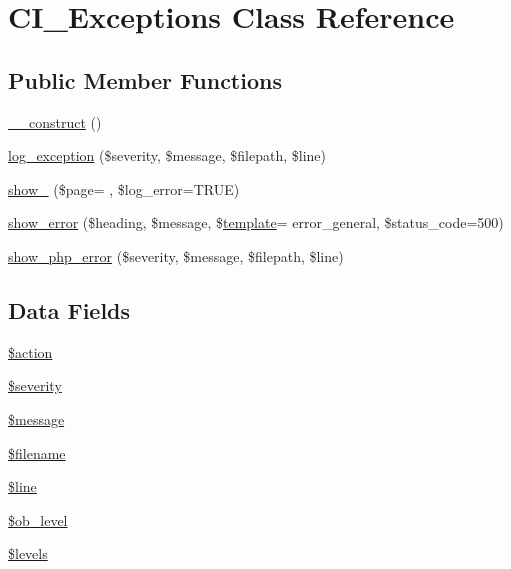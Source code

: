 \hypertarget{class_c_i___exceptions}{}\section{C\+I\+\_\+\+Exceptions Class Reference}
\label{class_c_i___exceptions}
\subsection*{Public Member Functions}
\begin{DoxyCompactItemize}
\item 
\hyperlink{class_c_i___exceptions_a095c5d389db211932136b53f25f39685}{\+\_\+\+\_\+construct} ()
\item 
\hyperlink{class_c_i___exceptions_a477bd3360509887aeb6e0a56bcdcad2a}{log\+\_\+exception} (\$severity, \$message, \$filepath, \$line)
\item 
\hyperlink{class_c_i___exceptions_a7ec82c1b0d3bbeb9338f236a1755a2a5}{show\+\_} (\$page= \textquotesingle{}\textquotesingle{}, \$log\+\_\+error=T\+R\+UE)
\item 
\hyperlink{class_c_i___exceptions_af68ad4102f7a42f9aaf68c40afe6d02c}{show\+\_\+error} (\$heading, \$message, \$\hyperlink{_chart_8_core_8js_aad213e71e8f7878665e0af623a88a79a}{template}= \textquotesingle{}error\+\_\+general\textquotesingle{}, \$status\+\_\+code=500)
\item 
\hyperlink{class_c_i___exceptions_a7962c30cacf1341dac1c44d8ab57cebe}{show\+\_\+php\+\_\+error} (\$severity, \$message, \$filepath, \$line)
\end{DoxyCompactItemize}
\subsection*{Data Fields}
\begin{DoxyCompactItemize}
\item 
\hyperlink{class_c_i___exceptions_aa698a3e72116e8e778be0e95d908ee30}{\$action}
\item 
\hyperlink{class_c_i___exceptions_a85759894d444d7191251479d87eaf8c6}{\$severity}
\item 
\hyperlink{class_c_i___exceptions_abf17cb2dba2ed17cb28aa5f37deb5293}{\$message}
\item 
\hyperlink{class_c_i___exceptions_a0722441477f957078ee2437054556cbc}{\$filename}
\item 
\hyperlink{class_c_i___exceptions_a52f469b0182d9abac2d0f20548680c9c}{\$line}
\item 
\hyperlink{class_c_i___exceptions_abb6b6587dbaf0238bf26829c8df05d59}{\$ob\+\_\+level}
\item 
\hyperlink{class_c_i___exceptions_a1035dc0448354cc79f8f9e1ca8dfd0cb}{\$levels}
\end{DoxyCompactItemize}


